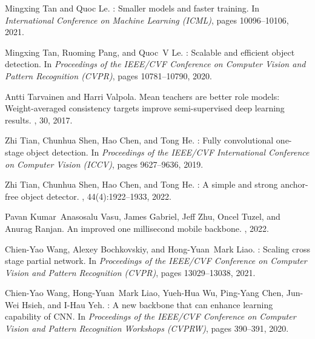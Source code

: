\documentclass[10pt,twocolumn,letterpaper]{article}
\begin{document}
{\begin{thebibliography}{100}
				Mingxing Tan and Quoc Le.
				: Smaller models and faster training.
				\newblock In {\em International Conference on Machine Learning (ICML)}, pages
				10096--10106, 2021.
				
				Mingxing Tan, Ruoming Pang, and Quoc~V Le.
				: Scalable and efficient object detection.
				\newblock In {\em Proceedings of the IEEE/CVF Conference on Computer Vision and
					Pattern Recognition (CVPR)}, pages 10781--10790, 2020.
				
				Antti Tarvainen and Harri Valpola.
				\newblock Mean teachers are better role models: Weight-averaged consistency
				targets improve semi-supervised deep learning results.
				,
				30, 2017.
				
				Zhi Tian, Chunhua Shen, Hao Chen, and Tong He.
				: Fully convolutional one-stage object detection.
				\newblock In {\em Proceedings of the IEEE/CVF International Conference on
					Computer Vision (ICCV)}, pages 9627--9636, 2019.
				
				Zhi Tian, Chunhua Shen, Hao Chen, and Tong He.
				: A simple and strong anchor-free object detector.
				, 44(4):1922--1933, 2022.
				
				Pavan Kumar~Anasosalu Vasu, James Gabriel, Jeff Zhu, Oncel Tuzel, and Anurag
				Ranjan.
				\newblock An improved one millisecond mobile backbone.
				, 2022.
				
				Chien-Yao Wang, Alexey Bochkovskiy, and Hong-Yuan~Mark Liao.
				: Scaling cross stage partial network.
				\newblock In {\em Proceedings of the IEEE/CVF Conference on Computer Vision and
					Pattern Recognition (CVPR)}, pages 13029--13038, 2021.
				
				Chien-Yao Wang, Hong-Yuan~Mark Liao, Yueh-Hua Wu, Ping-Yang Chen, Jun-Wei
				Hsieh, and I-Hau Yeh.
				: A new backbone that can enhance learning capability of
				{CNN}.
				\newblock In {\em Proceedings of the IEEE/CVF Conference on Computer Vision and
					Pattern Recognition Workshops (CVPRW)}, pages 390--391, 2020.
				

\end{thebibliography}}
\end{document}

